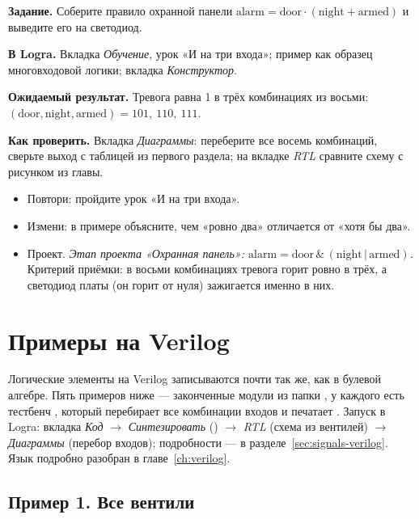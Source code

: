 \begin{diybox}
\textbf{Задание.} Соберите правило охранной панели
$\text{alarm}=\text{door}\cdot(\text{night}+\text{armed})$ и выведите его на
светодиод.\par
\textbf{В Logra.} Вкладка \emph{Обучение}, урок «И на три входа»; пример
 как образец многовходовой логики; вкладка
\emph{Конструктор}.\par
\textbf{Ожидаемый результат.} Тревога равна 1 в трёх комбинациях из восьми:
$(\text{door},\text{night},\text{armed})=101,\ 110,\ 111$.\par
\textbf{Как проверить.} Вкладка \emph{Диаграммы}: переберите все восемь
комбинаций, сверьте выход с таблицей из первого раздела; на вкладке
\emph{RTL} сравните схему с рисунком из главы.
\begin{itemize}[leftmargin=3.4em,labelwidth=3em,labelsep=0.4em,align=left]
  \item[\stars{1}] Повтори: пройдите урок «И на три входа».
  \item[\stars{2}] Измени: в примере  объясните, чем «ровно два»
    отличается от «хотя бы два».
  \item[\stars{3}] Проект. \emph{Этап проекта «Охранная панель»:
    $\text{alarm}=\text{door}\,\&\,(\text{night}\,|\,\text{armed})$.} Критерий
    приёмки: в восьми комбинациях тревога горит ровно в трёх, а светодиод
    платы (он горит от нуля) зажигается именно в них.
\end{itemize}
\end{diybox}

\section{Примеры на Verilog}
\label{sec:gates-verilog}

Логические элементы на Verilog записываются почти так же, как в булевой
алгебре. Пять примеров ниже --- законченные модули из папки
, у каждого есть тестбенч , который
перебирает все комбинации входов и печатает . Запуск в Logra:
вкладка \emph{Код} $\to$ \emph{Синтезировать} () $\to$
\emph{RTL} (схема из вентилей) $\to$ \emph{Диаграммы} (перебор входов);
подробности --- в разделе~\ref{sec:signals-verilog}. Язык подробно разобран в
главе~\ref{ch:verilog}.

\subsection{Пример 1. Все вентили}

